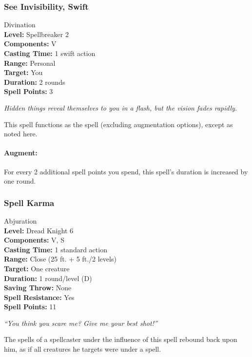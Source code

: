 \subsubsection[Swift See Invisibility]{See Invisibility, Swift}
\label{Spell:SwiftSeeInvisibility}
Divination
\\ \textbf{Level:} Spellbreaker 2
\\ \textbf{Components:} V
\\ \textbf{Casting Time:} 1 swift action
\\ \textbf{Range:} Personal
\\ \textbf{Target:} You
\\ \textbf{Duration:} 2 rounds
\\ \textbf{Spell Points:} 3

\emph{Hidden things reveal themselves to you in a flash, but the vision fades rapidly.}

This spell functions as the  spell (excluding augmentation options), except as noted here.

\paragraph{Augment:} For every 2 additional spell points you spend, this spell's duration is increased by one round.

\subsubsection{Spell Karma}
\label{Spell:SpellKarma}
Abjuration
\\ \textbf{Level:} Dread Knight 6
\\ \textbf{Components:} V, S
\\ \textbf{Casting Time:} 1 standard action
\\ \textbf{Range:} Close (25 ft. + 5 ft./2 levels)
\\ \textbf{Target:} One creature
\\ \textbf{Duration:} 1 round/level (D)
\\ \textbf{Saving Throw:} None
\\ \textbf{Spell Resistance:} Yes
\\ \textbf{Spell Points:} 11

\emph{``You think you scare me? Give me your best shot!''}

The spells of a spellcaster under the influence of this spell rebound back upon him, as if all creatures he targets were under a  spell.

